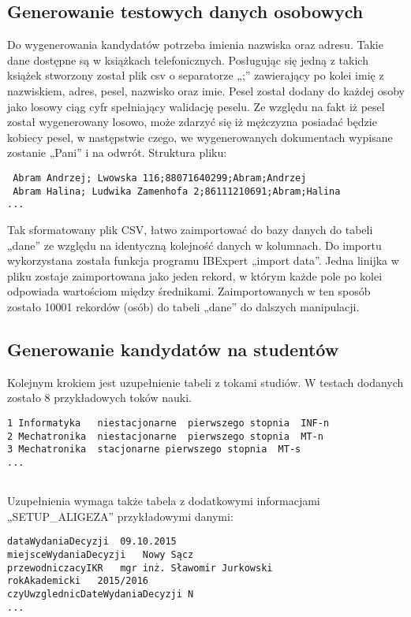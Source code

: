 \subsection{ Generowanie testowych danych osobowych}

Do wygenerowania kandydatów potrzeba imienia nazwiska oraz adresu. Takie dane dostępne są w książkach telefonicznych. Posługując się jedną z takich książek stworzony został plik csv o separatorze „;” zawierający po kolei imię z nazwiskiem, adres, pesel, nazwisko oraz imie. Pesel został dodany do każdej osoby jako losowy ciąg cyfr spełniający walidację peselu. Ze względu na fakt iż pesel został wygenerowany losowo, może zdarzyć się iż mężczyzna posiadać będzie kobiecy pesel, w następstwie czego, we wygenerowanych dokumentach wypisane zostanie „Pani” i na odwrót.
Struktura pliku:
\begin{lstlisting}
 Abram Andrzej; Lwowska 116;88071640299;Abram;Andrzej
 Abram Halina; Ludwika Zamenhofa 2;86111210691;Abram;Halina
...

\end{lstlisting}

Tak sformatowany plik CSV,  łatwo zaimportować do bazy danych do tabeli „dane” ze względu na identyczną kolejność danych w kolumnach. Do importu wykorzystana została funkcja programu IBExpert „import data”. Jedna linijka w pliku zostaje zaimportowana jako jeden rekord, w którym każde pole po kolei odpowiada wartościom między średnikami. Zaimportowanych w ten sposób zostało 10001 rekordów (osób) do tabeli „dane” do dalszych manipulacji.

\subsection{Generowanie kandydatów na studentów}

Kolejnym krokiem jest uzupełnienie tabeli z tokami studiów. W testach dodanych zostało 8 przykładowych toków nauki. 

\begin{lstlisting}
1 Informatyka	niestacjonarne	pierwszego stopnia	INF-n				
2 Mechatronika	niestacjonarne	pierwszego stopnia	MT-n				
3 Mechatronika	stacjonarne	pierwszego stopnia	MT-s				
...


\end{lstlisting}
Uzupełnienia wymaga także tabela z dodatkowymi informacjami „SETUP\_ALIGEZA” przykładowymi danymi:
\begin{lstlisting}
dataWydaniaDecyzji	09.10.2015
miejsceWydaniaDecyzji	Nowy Sącz
przewodniczacyIKR	mgr inż. Sławomir Jurkowski
rokAkademicki	2015/2016
czyUwzglednicDateWydaniaDecyzji	N
...

\end{lstlisting}

